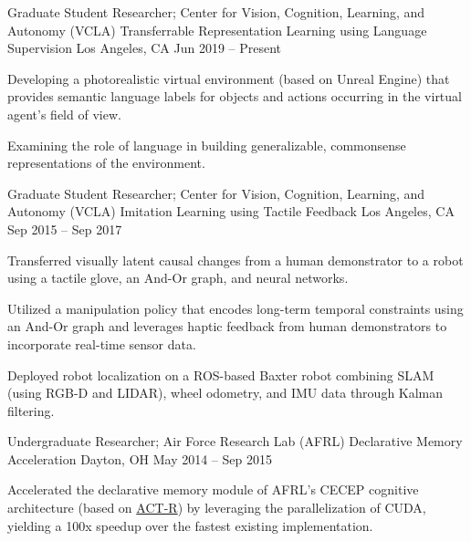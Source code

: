 \begin{cventries}

\cventry
{Graduate Student Researcher; Center for Vision, Cognition, Learning, and Autonomy (VCLA)}
{Transferrable Representation Learning using Language Supervision}
{Los Angeles, CA}
{Jun 2019 – Present}
{
\begin{cvitems}
\item Developing a photorealistic virtual environment (based on Unreal Engine) that provides semantic language labels for objects and actions occurring in the virtual agent's field of view.
\item Examining the role of language in building generalizable, commonsense representations of the environment.
\end{cvitems}
}


\cventry
{Graduate Student Researcher; Center for Vision, Cognition, Learning, and Autonomy (VCLA)}
{Imitation Learning using Tactile Feedback}
{Los Angeles, CA}
{Sep 2015 – Sep 2017}
{
\begin{cvitems}
\item Transferred visually latent causal changes from a human demonstrator to a robot using a tactile glove, an And-Or graph, and neural networks.
\item Utilized a manipulation policy that encodes long-term temporal constraints using an And-Or graph and leverages haptic feedback from human demonstrators to incorporate real-time sensor data.
\item Deployed robot localization on a ROS-based Baxter robot combining SLAM (using RGB-D and LIDAR), wheel odometry, and IMU data through Kalman filtering.
\end{cvitems}
}


\cventry
{Undergraduate Researcher; Air Force Research Lab (AFRL)}
{Declarative Memory Acceleration}
{Dayton, OH}
{May 2014 – Sep 2015}
{
\begin{cvitems}
\item Accelerated the declarative memory module of AFRL's CECEP cognitive architecture (based on \href{http://act-r.psy.cmu.edu/}{ACT-R}) by leveraging the parallelization of CUDA, yielding a 100x speedup over the fastest existing implementation.
\end{cvitems}
}


\end{cventries}